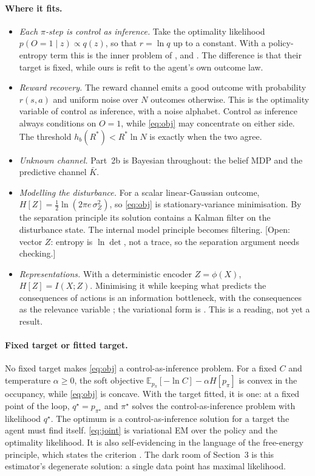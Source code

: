 \documentclass[10pt]{article}
\newcommand{\E}{\mathbb E}
\newcommand{\open}[1]{\textcolor{red!70!black}{[Open: #1]}}
\begin{document}
\paragraph{Where it fits.}
\begin{itemize}
\item \emph{Each $\pi$-step is control as inference.} Take the optimality likelihood $p(O=1\mid z) \propto q(z)$, so that $r = \ln q$ up to a constant. With a policy-entropy term this is the inner problem of \citet{Levine-reinforcement18}, \citet{Toussaint-probabilistic06} and \citet{Rawlik-stochastic12}. The difference is that their target is fixed, while ours is refit to the agent's own outcome law.
\item \emph{Reward recovery.} The reward channel emits a good outcome with probability $r(s,a)$ and uniform noise over $N$ outcomes otherwise. This is the optimality variable of control as inference, with a noise alphabet. Control as inference always conditions on $O=1$, while \eqref{eq:obj} may concentrate on either side. The threshold $h_b(R^*) < R^* \ln N$ is exactly when the two agree.
\item \emph{Unknown channel.} Part~2b is Bayesian throughout: the belief MDP and the predictive channel $\bar K$.
\item \emph{Modelling the disturbance.} For a scalar linear-Gaussian outcome, $H[Z] = \tfrac12 \ln(2\pi e\, \sigma_Z^2)$, so \eqref{eq:obj} is stationary-variance minimisation. By the separation principle its solution contains a Kalman filter on the disturbance state. The internal model principle becomes filtering. \open{vector $Z$: entropy is $\ln\det$, not a trace, so the separation argument needs checking.}
\item \emph{Representations.} With a deterministic encoder $Z=\phi(X)$, $H[Z] = I(X;Z)$. Minimising it while keeping what predicts the consequences of actions is an information bottleneck, with the consequences as the relevance variable \citep{Tishby-information99}; the variational form is \citet{Alemi-deep17}. This is a reading, not yet a result.
\end{itemize}

\paragraph{Fixed target or fitted target.} No fixed target makes \eqref{eq:obj} a control-as-inference problem. For a fixed $C$ and temperature $\alpha \ge 0$, the soft objective $\E_{p_\pi}[-\ln C] - \alpha H[p_\pi]$ is convex in the occupancy, while \eqref{eq:obj} is concave. With the target fitted, it is one: at a fixed point of the loop, $q^\star = p_{\pi^\star}$ and $\pi^\star$ solves the control-as-inference problem with likelihood $q^\star$. The optimum is a control-as-inference solution for a target the agent must find itself. \eqref{eq:joint} is variational EM over the policy and the optimality likelihood. It is also self-evidencing in the language of the free-energy principle, which states the criterion \citep{Friston-free12c}. The dark room of Section~3 is this estimator's degenerate solution: a single data point has maximal likelihood.
\end{document}
